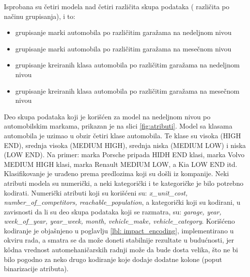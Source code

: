 \documentclass[12pt,oneside]{memoir}
\begin{document}
Isprobana su četiri modela nad četiri različita skupa podataka ( različita po načinu grupisanja), i to:
\begin{itemize}
    \item  grupisanje marki automobila po različitim garažama na nedeljnom nivou
    \item grupisanje marki automobila po različitim garažama na mesečnom nivou
    \item grupisanje kreiranih klasa automobila po različitim garažama na nedeljnom nivou
    \item grupisanje kreiranih klasa automobila po različitim garažama na mesečnom nivou
\end{itemize}
Deo skupa podataka koji je korišćen za model na nedeljnom nivou po automobilskim markama, prikazan je na slici \ref{fig:atributi}. Model sa klasama automobila je uzimao u obzir četiri klase automobila. Te klase su visoka (HIGH END), srednja visoka (MEDIUM HIGH), srednja niska (MEDIUM LOW) i niska (LOW END). Na primer: marka Porsche pripada HIDH END klasi, marka Volvo MEDIUM HIGH klasi, marka Renault MEDIUM LOW, a Kia LOW END itd. Klasifikovanje je urađeno prema predlozima koji su došli iz kompanije. Neki atributi modela su numerički, a neki kategorički i te kategoričke je bilo potrebno kodirati. Numerički atributi koji su korišćeni su: \textit{x\_unit\_cost, number\_of\_competitors, reachable\_population}, a kategorički koji su kodirani, u zavisnosti da li su deo skupa podataka koji se razmatra, su: \textit{garage, year, week\_of\_year, year\_week, month, vehicle\_make, vehicle\_category}. Korišćeno kodiranje je objašnjeno u poglavlju \ref{lbl: impact_encoding}, implementirano u okviru rada, a smatra se da može doneti stabilnije rezultate u budućnosti, jer kôdna vrednost automehaničarskih radnji može da bude dosta velika, što ne bi bilo pogodno za neko drugo kodiranje koje dodaje dodatne kolone (poput binarizacije atributa).
\end{document}
